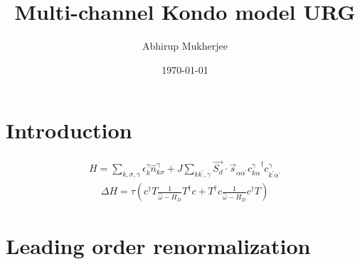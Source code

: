\documentclass[12pt]{article}
\begin{document}
\title{Multi-channel Kondo model URG}
\author{Abhirup Mukherjee}
\date{\today}
\maketitle
\section{Introduction}

\begin{equation}\begin{aligned}
	H = \sum_{k,\sigma,\gamma}\epsilon_{k}^\gamma \hat n^\gamma_{k\sigma} + J\sum_{kk^\prime,\gamma} \vec{S_d}\cdot\vec{s}_{\alpha\alpha^\prime}{c^\gamma_{k\alpha}}^\dagger c^\gamma_{k^\prime\alpha^\prime}
\end{aligned}\end{equation}
\begin{equation}\begin{aligned}
	\Delta H = \tau\left(c^\dagger T \frac{1}{\hat \omega - H_D}T^\dagger c + T^\dagger c \frac{1}{\hat \omega - H_D}c^\dagger T\right)
\end{aligned}\end{equation}

\section{Leading order renormalization}
\end{document}
